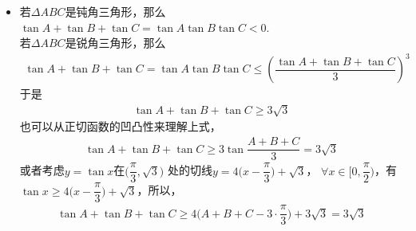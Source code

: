 \begin{itemize}[leftmargin=\inteval{\myitemleftmargin}pt,itemsep=
    \inteval{\myitemitempsep}pt,topsep=\inteval{\myitemtopsep}pt]
\item 若$ \Delta ABC $是钝角三角形，那么$ \tan A+\tan B +\tan C =
\tan A \tan B\tan C <0 $.\\
若$ \Delta ABC $是锐角三角形，那么
\begin{gather*}
    \tan A+\tan B +\tan C =\tan A \tan B\tan C \leq \left(
    \dfrac{\tan A+\tan B +\tan C}{3}\right)^3
\end{gather*}
于是
\begin{gather*}
    \tan A+\tan B +\tan C\geq 3\sqrt{3}
\end{gather*}
也可以从正切函数的凹凸性来理解上式，
\begin{gather*}
    \tan A+\tan B +\tan C\geq 3\tan\dfrac{A+B+C}{3}=3\sqrt{3}
\end{gather*}
或者考虑$ y=\tan x $在$ \Big(\dfrac{\pi}{3},\sqrt{3}\Big) $
处的切线$ y=4\Big(x-\dfrac{\pi}{3}\Big)+\sqrt{3} $，
$ \forall x\in \Big[0,\dfrac{\pi}{2}\Big) $，有$ \tan x\geq 
4\Big(x-\dfrac{\pi}{3}\Big)+\sqrt{3} $，所以，
\begin{gather*}
    \tan A +\tan B +\tan C \geq 4\Big(A+B+C-3\cdot\dfrac{\pi}{3}\Big)
    +3\sqrt{3}=3\sqrt{3}
\end{gather*}
    
\end{itemize}

